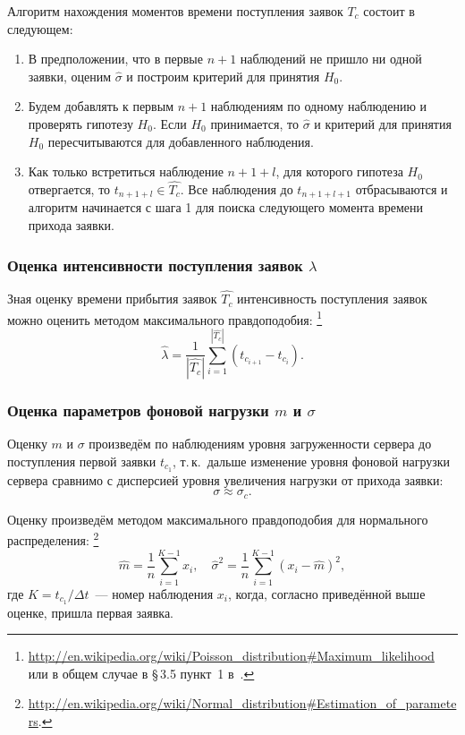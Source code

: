 \documentclass[a4paper,10pt]{article}
\begin{document}
Алгоритм нахождения моментов времени поступления заявок $T_c$ 
состоит в следующем:
\begin{enumerate}
  \item В предположении, что в первые $n+1$ наблюдений не пришло ни одной 
  заявки, оценим $\widehat{\sigma}$ и построим критерий для принятия $H_0$.
  \item Будем добавлять к первым $n+1$ наблюдениям по одному наблюдению и 
  проверять гипотезу $H_0$.
  Если $H_0$ принимается, то $\widehat{\sigma}$ и критерий для принятия $H_0$ 
  пересчитываются для добавленного наблюдения.
  \item Как только встретиться наблюдение $n+1+l$, для которого гипотеза $H_0$
  отвергается, то \mbox{$t_{n+1+l} \in \widehat{T_c}$}. 
  Все наблюдения до $t_{n+1+l+1}$ отбрасываются и алгоритм начинается с шага 1
  для поиска следующего момента времени прихода заявки.
\end{enumerate}

\subsubsection{Оценка интенсивности поступления заявок $\lambda$}
Зная оценку времени прибытия заявок $\widehat{T_c}$ 
интенсивность поступления заявок можно оценить
методом максимального правдоподобия:%
\footnote{{\url{http://en.wikipedia.org/wiki/Poisson\_distribution\#Maximum\_likelihood}} 
или в общем случае в \S\,3.5 пункт~1 в~\cite{ivchmed2010matstat}.}
$$\widehat{\lambda} = 
    \frac{1}{|\widehat{T_c}|} 
        \sum\limits_{i=1}^{|\widehat{T_c}|} (t_{c_{i+1}} - t_{c_i}).$$

\subsubsection{Оценка параметров фоновой нагрузки $m$ и $\sigma$}%
\label{lc0-m-sigma}
Оценку $m$ и $\sigma$ произведём по наблюдениям уровня загруженности 
сервера до поступления первой заявки $t_{c_1}$, 
т.\,к.~дальше изменение уровня фоновой нагрузки сервера сравнимо с дисперсией 
уровня увеличения нагрузки от прихода заявки: 
$$\sigma \approx \sigma_c.$$

Оценку произведём методом максимального правдоподобия для нормального 
распределения:%
\footnote{{\url{http://en.wikipedia.org/wiki/Normal\_distribution\#Estimation_of_parameters}}.} 
$$
  \widehat{m} = \frac{1}{n} \sum\limits_{i=1}^{K-1} x_i, \quad
  \widehat{\sigma}^2 = 
      \frac{1}{n} \sum\limits_{i=1}^{K-1} (x_i - \widehat{m})^2,
$$
где $K = t_{c_1} / \Delta t$~--- 
номер наблюдения $x_i$, когда, согласно приведённой выше оценке,
пришла первая заявка.
\end{document}
